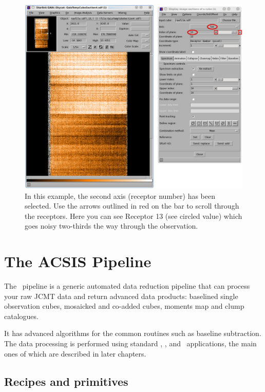 \documentclass[11pt,oneside,chapters]{starlink}
\begin{document}
\begin{figure}[h!]
\begin{center}
\includegraphics[width=0.9\linewidth]{sc20_badreceptor2}
\caption[Identifying bad receptors in the raw data: second method.]{\label{fig:maskreceptor2}
  In this example, the second axis (receptor number) has been
  selected. Use the arrows outlined in red on the  bar to scroll through the receptors. Here you can see
  Receptor 13 (see circled  value) which
  goes noisy two-thirds the way through the observation.}
\end{center}
\end{figure}


\newpage
\chapter{The ACSIS Pipeline}
\label{sec:pipe}

The \ORACDR\ pipeline \cite{oracdr} is a generic automated data
reduction pipeline that can process your raw JCMT data and return
advanced data products: baselined single observation cubes, mosaicked
and co-added cubes, moments map and clump catalogues.
\cite{heterodyne_pipeline}

It has advanced algorithms for the common routines such as baseline
subtraction. The data processing is performed using standard \Kappa,
\smurf, and \cupid\ applications, the main ones of which are
described in later chapters.

\section{Recipes and primitives}
\label{sec:recipes}
\end{document}
